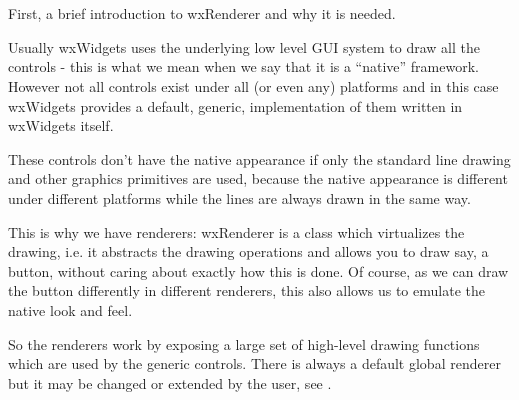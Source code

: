 
\section{}\label{wxrenderernative}

First, a brief introduction to wxRenderer and why it is needed.

Usually wxWidgets uses the underlying low level GUI system to draw all the
controls - this is what we mean when we say that it is a ``native'' framework.
However not all controls exist under all (or even any) platforms and in this
case wxWidgets provides a default, generic, implementation of them written in
wxWidgets itself.

These controls don't have the native appearance if only the standard
line drawing and other graphics primitives are used, because the native
appearance is different under different platforms while the lines are always
drawn in the same way.

This is why we have renderers: wxRenderer is a class which virtualizes the
drawing, i.e. it abstracts the drawing operations and allows you to draw say, a
button, without caring about exactly how this is done. Of course, as we
can draw the button differently in different renderers, this also allows us to
emulate the native look and feel.

So the renderers work by exposing a large set of high-level drawing functions
which are used by the generic controls. There is always a default global
renderer but it may be changed or extended by the user, see 
.

